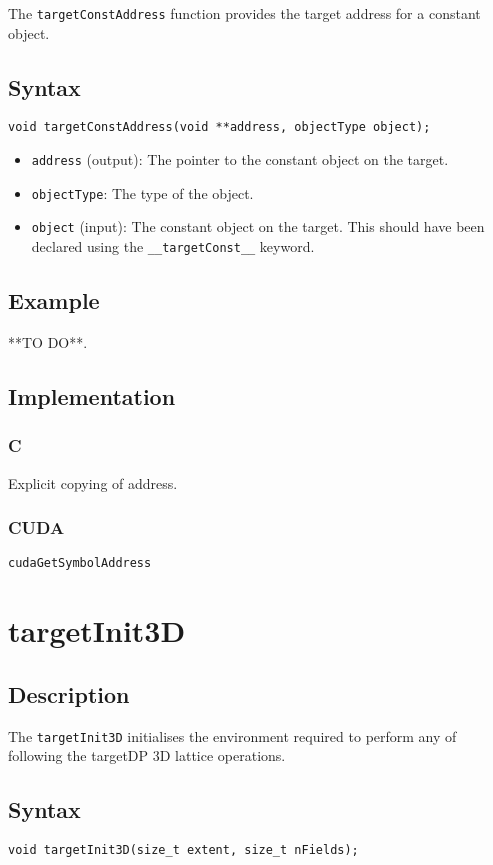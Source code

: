 The \verb+targetConstAddress+ function provides the target address for a constant object.

\subsection{Syntax}
\begin{verbatim}
void targetConstAddress(void **address, objectType object);
\end{verbatim}

\begin{itemize}
\item \verb+address+ (output): The pointer to the constant object on the target.
\item \verb+objectType+: The type of the object.
\item \verb+object+ (input): The constant object on the target. This should have been declared using the \verb+__targetConst__+ keyword.
\end{itemize}


\subsection{Example}
**TO DO**.

\subsection{Implementation}
\subsubsection{C}
Explicit copying of address.
\subsubsection{CUDA}
\verb+cudaGetSymbolAddress+

\newpage
\section{targetInit3D}

\subsection{Description}

The \verb+targetInit3D+ initialises the environment required to perform any of following the targetDP 3D lattice operations.

\subsection{Syntax}
\begin{verbatim}
void targetInit3D(size_t extent, size_t nFields);
\end{verbatim}

